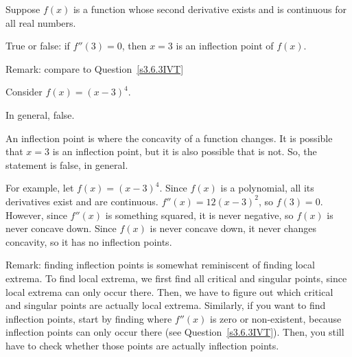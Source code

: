 \begin{question}\label{s3.6.3converse}
Suppose $f(x)$ is a function whose second derivative exists and is continuous for all real numbers.

True or false: if $f''(3)=0$, then $x=3$ is an inflection point of $f(x)$.

Remark: compare to Question~\ref{s3.6.3IVT}
\end{question}
\begin{hint}
Consider $f(x)=(x-3)^4$.
\end{hint}
\begin{answer}
In general, false.
\end{answer}
\begin{solution}
An inflection point is where the concavity of a function changes. It is possible that $x=3$ is an inflection point, but it is also possible that is not. So, the statement is false, in general.

For example, let $f(x)=(x-3)^4$. Since $f(x)$ is a polynomial, all its derivatives exist and are continuous. $f''(x)=12(x-3)^2$, so $f(3)=0$. However, since $f''(x)$ is something squared, it is never negative, so $f(x)$ is never concave down. Since $f(x)$ is never concave down, it never changes concavity, so it has no inflection points.

Remark: finding inflection points is somewhat reminiscent of finding local extrema. To find local extrema, we first find all critical and singular points, since local extrema can only occur there. Then, we have to figure out which critical and singular points are actually local extrema. Similarly, if you want to find inflection points, start by finding where $f''(x)$ is zero or non-existent, because inflection points can only occur there (see Question~\ref{s3.6.3IVT}). Then, you still have to check whether those points are actually inflection points.
\end{solution}
\subsection*{\Procedural}


